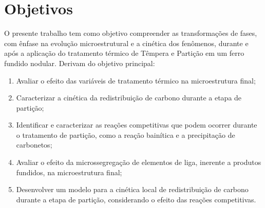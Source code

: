 \chapter{Objetivos}

O presente trabalho tem como objetivo compreender as transformações de fases, com ênfase na evolução microestrutural e a cinética dos fenômenos, durante e após a aplicação do tratamento térmico de Têmpera e Partição em um ferro fundido nodular. Derivam do objetivo principal:

\begin{enumerate}
	\item Avaliar o efeito das variáveis de tratamento térmico na microestrutura final;

	\item Caracterizar a cinética da redistribuição de carbono durante a etapa de partição;

	\item Identificar e caracterizar as reações competitivas que podem ocorrer durante o tratamento de partição, como a reação bainítica e a precipitação de carbonetos;

	\item Avaliar o efeito da microssegregação de elementos de liga, inerente a produtos fundidos, na microestrutura final;

	\item Desenvolver um modelo para a cinética local de redistribuição de carbono durante a etapa de partição, considerando o efeito das reações competitivas.
\end{enumerate}
